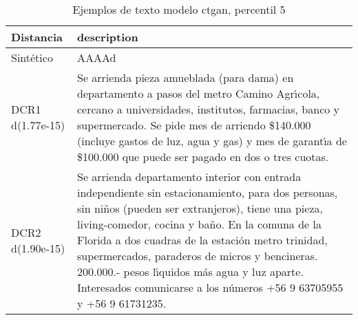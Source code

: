 \begin{table}[H]
\centering
\fontsize{10}{14}\selectfont
\caption{Ejemplos de texto modelo ctgan, percentil 5}
\label{table-example-economicos-b-1-ctgan-5p-text}
\begin{tabular}{|l|m{35em}|}
\hline
\rowcolor[gray]{0.8}
Distancia & description \\
\hline Sintético & AAAAd \\
\hline DCR1 d(1.77e-15) & Se arrienda pieza amueblada (para dama) en departamento a pasos del metro Camino Agr{\'\i}cola, cercano a universidades, institutos, farmacias, banco y supermercado.
Se pide mes de arriendo \$140.000 (incluye gastos de luz, agua y gas) y mes de garant{\'\i}a de \$100.000 que puede ser pagado en dos o tres cuotas. \\
\hline DCR2 d(1.90e-15) & Se arrienda departamento interior con entrada independiente sin estacionamiento, para dos personas, sin ni\~nos (pueden ser extranjeros), tiene una pieza, living-comedor, cocina y ba\~no. En la comuna de la Florida a dos cuadras de la estaci\'on metro trinidad, supermercados, paraderos de micros y bencineras.  200.000.- pesos l{\'\i}quidos m\'as agua y luz aparte. Interesados comunicarse a los n\'umeros +56 9 63705955 y +56 9 61731235. \\
\hline
\end{tabular}
\end{table}
